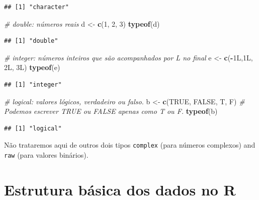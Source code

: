\documentclass[
]{article}
\newenvironment{Shaded}{\begin{snugshade}}{\end{snugshade}}
\newcommand{\CommentTok}[1]{\textcolor[rgb]{0.56,0.35,0.01}{\textit{#1}}}
\newcommand{\DecValTok}[1]{\textcolor[rgb]{0.00,0.00,0.81}{#1}}
\newcommand{\KeywordTok}[1]{\textcolor[rgb]{0.13,0.29,0.53}{\textbf{#1}}}
\newcommand{\NormalTok}[1]{#1}
\newcommand{\OperatorTok}[1]{\textcolor[rgb]{0.81,0.36,0.00}{\textbf{#1}}}
\newcommand{\OtherTok}[1]{\textcolor[rgb]{0.56,0.35,0.01}{#1}}
\newcommand{\StringTok}[1]{\textcolor[rgb]{0.31,0.60,0.02}{#1}}
\begin{document}
\begin{verbatim}
## [1] "character"
\end{verbatim}

\begin{Shaded}
\begin{Highlighting}[]
\CommentTok{# double: números reais}
\NormalTok{d <-}\StringTok{ }\KeywordTok{c}\NormalTok{(}\DecValTok{1}\NormalTok{, }\DecValTok{2}\NormalTok{, }\DecValTok{3}\NormalTok{)}
\KeywordTok{typeof}\NormalTok{(d)}
\end{Highlighting}
\end{Shaded}

\begin{verbatim}
## [1] "double"
\end{verbatim}

\begin{Shaded}
\begin{Highlighting}[]
\CommentTok{# integer: números inteiros que são acompanhados por L no final}
\NormalTok{e <-}\StringTok{ }\KeywordTok{c}\NormalTok{(}\OperatorTok{-}\NormalTok{1L,1L, 2L, 3L) }
\KeywordTok{typeof}\NormalTok{(e)}
\end{Highlighting}
\end{Shaded}

\begin{verbatim}
## [1] "integer"
\end{verbatim}

\begin{Shaded}
\begin{Highlighting}[]
\CommentTok{# logical: valores lógicos, verdadeiro ou falso.}
\NormalTok{b <-}\StringTok{ }\KeywordTok{c}\NormalTok{(}\OtherTok{TRUE}\NormalTok{, }\OtherTok{FALSE}\NormalTok{, T, F) }\CommentTok{# Podemos escrever TRUE ou FALSE apenas como T ou F.}
\KeywordTok{typeof}\NormalTok{(b)}
\end{Highlighting}
\end{Shaded}

\begin{verbatim}
## [1] "logical"
\end{verbatim}

Não trataremos aqui de outros dois tipos \texttt{complex} (para números
complexos) and \texttt{raw} (para valores binários).

\hypertarget{estrutura-buxe1sica-dos-dados-no-r}{%
\section{\texorpdfstring{Estrutura básica dos dados no
\textbf{R}}{Estrutura básica dos dados no R}}\label{estrutura-buxe1sica-dos-dados-no-r}}
\end{document}
